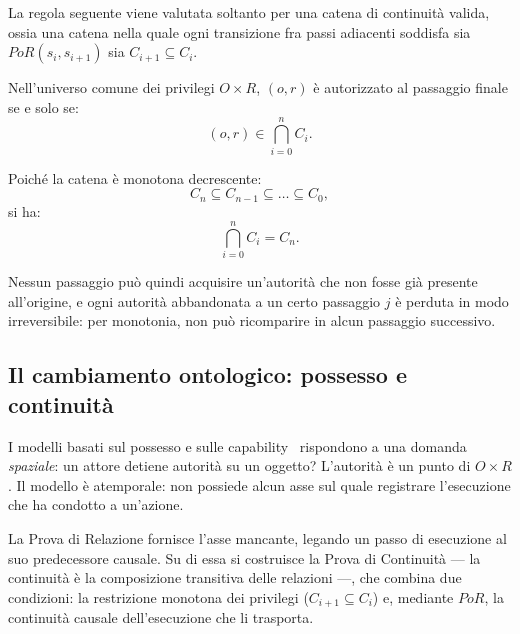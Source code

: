 \documentclass[11pt]{article}
\begin{document}
La regola seguente viene valutata soltanto per una catena di continuità valida,
ossia una catena nella quale ogni transizione fra passi adiacenti soddisfa sia
$PoR(s_i,s_{i+1})$ sia $C_{i+1}\subseteq C_i$.

Nell'universo comune dei privilegi $O \times R$, $(o,r)$ è autorizzato al
passaggio finale se e solo se:
\[
(o,r) \in \bigcap_{i=0}^{n} C_i.
\]

Poiché la catena è monotona decrescente:
\[
C_n \subseteq C_{n-1} \subseteq \dots \subseteq C_0,
\]
si ha:
\[
\bigcap_{i=0}^{n} C_i = C_n.
\]

Nessun passaggio può quindi acquisire un'autorità che non fosse già presente
all'origine, e ogni autorità abbandonata a un certo passaggio $j$ è perduta in
modo irreversibile: per monotonia, non può ricomparire in alcun passaggio
successivo.

\subsection{Il cambiamento ontologico: possesso e continuità}

I modelli basati sul possesso e sulle
capability~\cite{dennis1966programming,miller2003capability} rispondono a una
domanda \emph{spaziale}: un attore detiene autorità su un oggetto? L'autorità è
un punto di $O \times R$. Il modello è atemporale: non possiede alcun asse sul
quale registrare l'esecuzione che ha condotto a un'azione.

La Prova di Relazione fornisce l'asse mancante, legando un passo di esecuzione
al suo predecessore causale. Su di essa si costruisce la Prova di Continuità ---
la continuità è la composizione transitiva delle relazioni ---, che combina due
condizioni: la restrizione monotona dei privilegi
($C_{i+1} \subseteq C_i$) e, mediante $PoR$, la continuità causale
dell'esecuzione che li trasporta.
\end{document}
